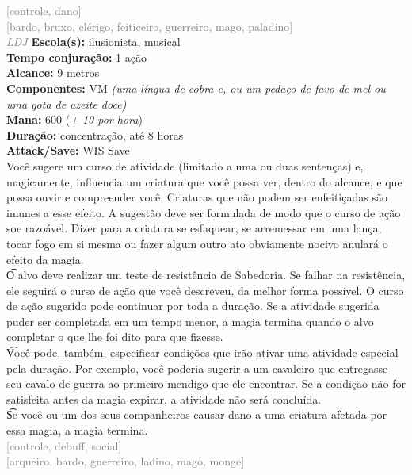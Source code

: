\documentclass{RPG_Adventure}[2021/10/20]
\begin{document}
{\scriptsize \textcolor{gray}{[controle, dano]\\}}
{\scriptsize \textcolor{gray}{[bardo, bruxo, clérigo, feiticeiro, guerreiro, mago, paladino]\\}}
{\tiny \textcolor{gray}{\textit{LDJ}}}
{\small \t \textbf{Escola(s):} ilusionista, musical\\\t \textbf{Tempo conjuração:} 1 ação\\\t \textbf{Alcance:} 9 metros\\\t \textbf{Componentes:} VM \textit{(uma língua de cobra e, ou um pedaço de favo de mel ou uma gota de azeite doce)}\\\t \textbf{Mana:} 600 (\textit{+ 10 por hora})\\\t \textbf{Duração:} concentração, até 8 horas\\\t \textbf{Attack/Save:} WIS Save\\}
{\normalsize Você sugere um curso de atividade (limitado a uma ou duas sentenças) e, magicamente, influencia um criatura que você possa ver, dentro do alcance, e que possa ouvir e compreender você. Criaturas que não podem ser enfeitiçadas são imunes a esse efeito. A sugestão deve ser formulada de modo que o curso de ação soe razoável. Dizer para a criatura se esfaquear, se arremessar em uma lança, tocar fogo em si mesma ou fazer algum outro ato obviamente nocivo anulará o efeito da magia.\\\t O alvo deve realizar um teste de resistência de Sabedoria. Se falhar na resistência, ele seguirá o curso de ação que você descreveu, da melhor forma possível. O curso de ação sugerido pode continuar por toda a duração. Se a atividade sugerida puder ser completada em um tempo menor, a magia termina quando o alvo completar o que lhe foi dito para que fizesse.\\\t Você pode, também, especificar condições que irão ativar uma atividade especial pela duração. Por exemplo, você poderia sugerir a um cavaleiro que entregasse seu cavalo de guerra ao primeiro mendigo que ele encontrar. Se a condição não for satisfeita antes da magia expirar, a atividade não será concluída.\\\t Se você ou um dos seus companheiros causar dano a uma criatura afetada por essa magia, a magia termina.\\}
{\scriptsize \textcolor{gray}{[controle, debuff, social]\\}}
{\scriptsize \textcolor{gray}{[arqueiro, bardo, guerreiro, ladino, mago, monge]\\}}
\end{document}

